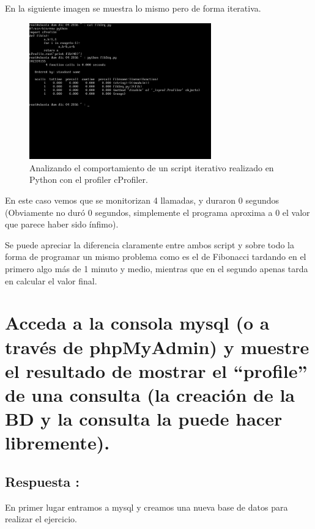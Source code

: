 En la siguiente imagen se muestra lo mismo pero de forma iterativa.

\begin{figure}[H]
	\begin{center}
		\includegraphics[width=0.7\textwidth]{Imagenes/Fibonacci_iterativo}
		\caption{Analizando el comportamiento de un script iterativo realizado en Python con el profiler cProfiler.} \label{fig:26}
	\end{center}
\end{figure}

En este caso vemos que se monitorizan 4 llamadas, y duraron 0 segundos (Obviamente no duró 0 segundos, simplemente el programa aproxima a 0 el valor que parece haber sido ínfimo).

Se puede apreciar la diferencia claramente entre ambos script y sobre todo la forma de programar un mismo problema como es el de Fibonacci tardando en el primero algo más de 1 minuto y medio, mientras que en el segundo apenas tarda en calcular el valor final.
\newpage
\section{Acceda a la consola mysql (o a través de phpMyAdmin) y muestre el resultado de mostrar el ``profile'' de una consulta (la creación de la BD y la consulta la puede hacer libremente).}
\subsection{Respuesta : }
En primer lugar entramos a mysql y creamos una nueva base de datos \cite{CREARBASEDATOSmysql} para realizar el ejercicio.

